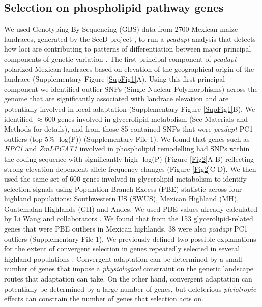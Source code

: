 \documentclass[9pt,twocolumn,twoside,lineno]{BioRxiv}
\begin{document}
\subsection{Selection on phospholipid pathway genes} 
We used Genotyping By Sequencing (GBS) data from 2700 Mexican maize landraces, generated by the SeeD project \cite{Romero_Navarro2017-cn, Gates2019-xu}, to run a \textit{pcadapt} analysis that detects how loci are contributing to patterns of differentiation between major principal components of genetic variation \cite{Luu2017-ws}.
The first principal component of \textit{pcadapt} polarized Mexican landraces based on elevation of the geographical origin of the landrace (Supplementary Figure \ref{SupFig1}A).
Using this first principal component we identified outlier SNPs (Single Nuclear Polymorphisms) across the genome that are significantly associated with landrace elevation and are potentially involved in local adaptation (Supplementary Figure \ref{SupFig1}B).
We identified $\approx 600$ genes involved in glycerolipid metabolism (See Materials and Methods for details), and from those 85 contained SNPs that were \textit{pcadapt} PC1 outliers (top 5\% -log(P)) (Supplementary File 1).
We found that genes such as \textit{HPC1} and \textit{ZmLPCAT1} involved in phospholipid remodelling had SNPs within the coding sequence with significantly high -log(P) (Figure \ref{Fig2}A-B) reflecting strong elevation dependent allele frequency changes (Figure \ref{Fig2}C-D). 
We then used the same set of 600 genes involved in glycerolipid metabolism to identify selection signals using Population Branch Excess (PBE) \cite{Pool2017-oa} statistic across four highland populations: Southwestern US (SWUS), Mexican Highland (MH), Guatemalan Highlands (GH) and Andes. 
We used PBE values already calculated by Li Wang  and collaborators \cite{Wang2020-mp}.
We found that from the 153 glycerolipid-related genes that were PBE outliers in Mexican highlands, 38 were also \textit{pcadapt} PC1 outliers (Supplementary File 1).
We previously defined two possible explanations for the extent of convergent selection in genes repeatedly selected in several highland populations \cite{Wang2020-mp, yeaman2018}. 
Convergent adaptation can be determined by a small number of genes that impose a \textit{physiological} constraint on the genetic landscape routes that adaptation can take. 
On the other hand, convergent adaptation can potentially be determined by a large number of genes, but deleterious \textit{pleiotropic} effects can constrain the number of genes that selection acts on.  
\end{document}
